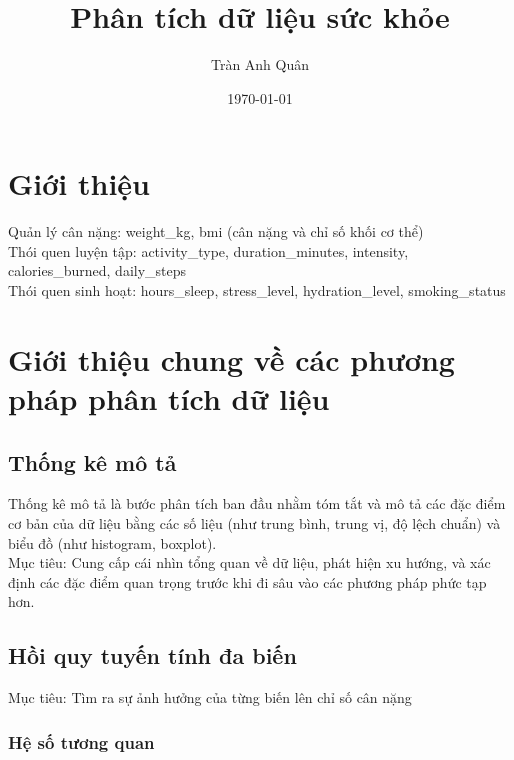 \documentclass[a4paper,12pt]{article}
\begin{document}
\title{Phân tích dữ liệu sức khỏe}
\author{Tràn Anh Quân}
\date{\today}
\maketitle

\section{Giới thiệu}
Quản lý cân nặng: weight\_kg, bmi (cân nặng và chỉ số khối cơ thể)\\
Thói quen luyện tập: activity\_type, duration\_minutes, intensity, calories\_burned, daily\_steps\\
Thói quen sinh hoạt: hours\_sleep, stress\_level, hydration\_level, smoking\_status

\section{Giới thiệu chung về các phương pháp phân tích dữ liệu}
\subsection{Thống kê mô tả}
Thống kê mô tả là bước phân tích ban đầu nhằm tóm tắt và mô tả các đặc điểm cơ bản của dữ liệu bằng các số liệu (như trung bình, trung vị, độ lệch chuẩn) và biểu đồ (như histogram, boxplot).\\
Mục tiêu: Cung cấp cái nhìn tổng quan về dữ liệu, phát hiện xu hướng, và xác định các đặc điểm quan trọng trước khi đi sâu vào các phương pháp phức tạp hơn.
\subsection{Hồi quy tuyến tính đa biến}
Mục tiêu: Tìm ra sự ảnh hưởng của từng biến lên chỉ số cân nặng
\subsubsection{Hệ số tương quan}
\end{document}
